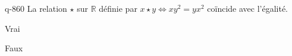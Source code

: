 \begin{truefalse}{q-860}
La relation $\star$ sur $\mathbb R$ définie par $x\star y \iff xy^2=yx^2$ coïncide avec l'égalité.
\item Vrai
\item* Faux
\end{truefalse}

